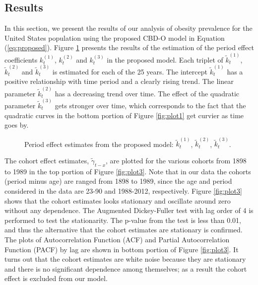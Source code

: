 \documentclass[11pt,letterpaper]{article}
\numberwithin{equation}{section}
\begin{document}
\subsection{Results}

In this section, we present the results of our analysis of obesity prevalence for the United States population using the proposed CBD-O model in Equation (\ref{eq:proposed}). Figure \ref{fig:plot2} presents the results of the estimation  of the period effect coefficients $k_t^{(1)}$, $k_t^{(2)}$ and $k_t^{(3)}$ in the proposed model. Each triplet of $\tilde k_t^{(1)}$, $\tilde k_t^{(2)}$ and $\tilde k_t^{(3)}$ is estimated for each of the 25 years. The intercept $\tilde k_t^{(1)}$ has a positive relationship with time period and a clearly rising trend. The linear parameter $\tilde k_t^{(2)}$ has a decreasing trend  over time. The effect of the quadratic parameter $\tilde k_t^{(3)}$ gets stronger over time, which corresponds to the fact that the quadratic curves in the bottom portion of Figure \ref{fig:plot1} get curvier as time goes by.


\begin{figure}
\begin{center}
{}
\caption{\label{fig:plot2}Period effect estimates from the proposed model: $\tilde k_t^{(1)}$, $\tilde k_t^{(2)}$, $\tilde k_t^{(3)}$.}
\end{center}
\end{figure}


The cohort effect estimates, $\tilde \gamma_{t-x}$, are plotted for the various cohorts from 1898 to 1989 in the top portion of Figure \ref{fig:plot3}. Note that in our data the cohorts (period minus age) are ranged from 1898 to 1989, since the age and period considered in the data are 23-90 and 1988-2012, respectively. Figure \ref{fig:plot3} shows that the cohort estimates looks stationary and oscillate around zero without any dependence. The Augmented Dickey-Fuller test with lag order of 4 is performed to test the stationarity. The p-value from the test is less than 0.01, and thus the alternative that the cohort estimates are stationary is confirmed. The plots of Autocorrelation Function (ACF) and Partial Autocorrelation Function (PACF) by lag are shown in bottom portion of Figure \ref{fig:plot3}. It turns out that the cohort estimates are white noise because they are stationary and there is no significant dependence among themselves; as a result the cohort effect is excluded from our model.
\end{document}
